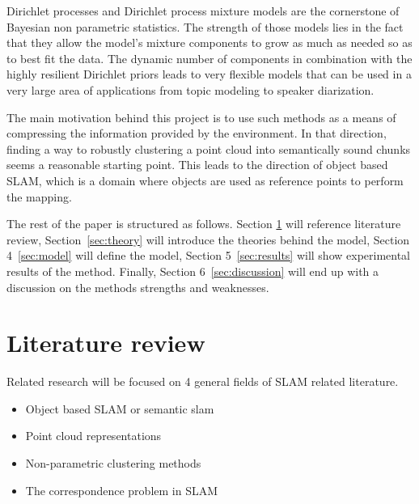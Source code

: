 \documentclass[twoside]{article}
\begin{document}
\begin{multicols}{2}
Dirichlet processes and Dirichlet process mixture models \cite{nonParam} are the cornerstone of Bayesian non parametric statistics. The strength of those models lies in the fact that they allow the model's mixture components to grow as much as needed so as to best fit the data. The dynamic number of components in combination with the highly resilient Dirichlet priors leads to very flexible models that can be used in a very large area of applications from topic modeling\cite{LDA} to speaker diarization\cite{speakerDiar}. 

The main motivation behind this project is to use such methods as a means of compressing the information provided by the environment. In that direction, finding a way to robustly clustering a point cloud into semantically sound chunks seems a reasonable starting point. This leads to the direction of object based SLAM, which is a domain where objects are used as reference points to perform the mapping.

The rest of the paper is structured as follows. Section \ref{sec:literature} will reference literature review, Section~\ref{sec:theory} will introduce the theories behind the model, Section 4~\ref{sec:model} will define the model, Section 5~\ref{sec:results} will show experimental results of the method. Finally, Section 6~\ref{sec:discussion} will end up with a discussion on the methods strengths and weaknesses.

 
\section{Literature review}
\label{sec:literature}

Related research will be focused on 4 general fields of SLAM related literature.
\begin{itemize}
	\item Object based SLAM or semantic slam
	\item Point cloud representations
	\item Non-parametric clustering methods
	\item The correspondence problem in SLAM
\end{itemize}


\end{multicols}
\end{document}
